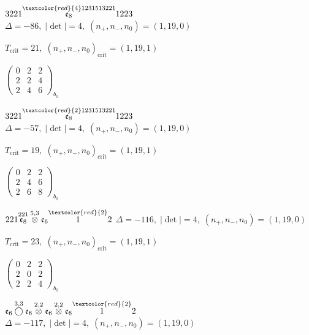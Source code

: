 \documentclass[10pt]{article}
\begin{document}
\smallskip

$3221\overset{\textcolor{red}{4}1231513221}{\mathfrak{e}_8}1223$ \quad $\Delta=-86,\; |\det|=4,\; (n_+,n_-,n_0)=(1,19,0)$

\hspace{1em}$T_{\text{crit}}=21,\; (n_+,n_-,n_0)_{\text{crit}}=(1,19,1)$

\hspace{2em}$\left(\begin{smallmatrix}0 & 2 & 2 \\ 2 & 2 & 4 \\ 2 & 4 & 6\end{smallmatrix}\right)_{\!b_0}$

$3221\overset{\textcolor{red}{2}1231513221}{\mathfrak{e}_8}1223$ \quad $\Delta=-57,\; |\det|=4,\; (n_+,n_-,n_0)=(1,19,0)$

\hspace{1em}$T_{\text{crit}}=19,\; (n_+,n_-,n_0)_{\text{crit}}=(1,19,1)$

\hspace{2em}$\left(\begin{smallmatrix}0 & 2 & 2 \\ 2 & 4 & 6 \\ 2 & 6 & 8\end{smallmatrix}\right)_{\!b_0}$

\smallskip

$221\overset{221}{\mathfrak{e}_8}\overset{5,3}{\otimes}\mathfrak{e}_6\overset{\textcolor{red}{2}}{1}2$ \quad $\Delta=-116,\; |\det|=4,\; (n_+,n_-,n_0)=(1,19,0)$

\hspace{1em}$T_{\text{crit}}=23,\; (n_+,n_-,n_0)_{\text{crit}}=(1,19,1)$

\hspace{2em}$\left(\begin{smallmatrix}0 & 2 & 2 \\ 2 & 0 & 2 \\ 2 & 2 & 4\end{smallmatrix}\right)_{\!b_0}$

\smallskip

$\mathfrak{e}_6\overset{3,3}{\bigcirc}\mathfrak{e}_6\overset{2,2}{\otimes}\mathfrak{e}_6\overset{2,2}{\otimes}\mathfrak{e}_6\overset{\textcolor{red}{2}}{1}2$ \quad $\Delta=-117,\; |\det|=4,\; (n_+,n_-,n_0)=(1,19,0)$
\end{document}
